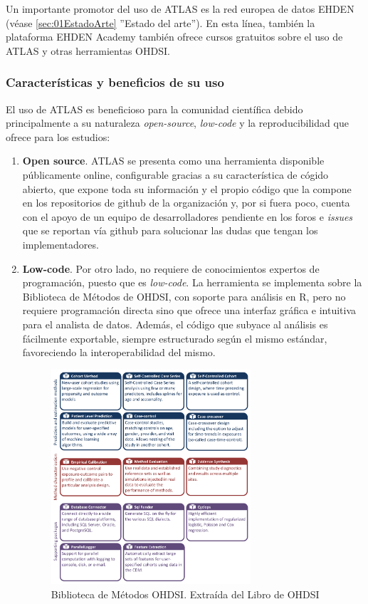 Un importante promotor del uso de ATLAS es la red europea de datos EHDEN (véase \ref{sec:01EstadoArte} ''Estado del arte''). En esta línea, también la plataforma EHDEN Academy también ofrece cursos gratuitos sobre el uso de ATLAS y otras herramientas OHDSI.

\subsubsection{Características y beneficios de su uso}

El uso de ATLAS es beneficioso para la comunidad científica debido principalmente a su naturaleza \textit{open-source}, \textit{low-code} y la reproducibilidad que ofrece para los estudios:

\begin{enumerate}[label=\roman*.]

    \item \textbf{Open source}. ATLAS se presenta como una herramienta disponible públicamente online, configurable gracias a su característica de cógido abierto, que expone toda su información y el propio código que la compone en los repositorios de github de la organización y, por si fuera poco, cuenta con el apoyo de un equipo de desarrolladores pendiente en los foros e \textit{issues} que se reportan vía github para solucionar las dudas que tengan los implementadores. 

    \item \textbf{Low-code}. Por otro lado, no requiere de conocimientos expertos de programación, puesto que es \textit{low-code}. La herramienta se implementa sobre la Biblioteca de Métodos de OHDSI, con soporte para análisis en R, pero no requiere programación directa sino que ofrece una interfaz gráfica e intuitiva para el analista de datos. Además, el código que subyace al análisis es fácilmente exportable, siempre estructurado según el mismo estándar, favoreciendo la interoperabilidad del mismo.

\begin{figure}[H]
\centering
\includegraphics[width=0.70\textwidth]{figures/methodsLibrary.png}
\caption{Biblioteca de Métodos OHDSI. Extraída del Libro de OHDSI \parencite{OHDSIbook}}
\label{fig:methodsLibrary}
\end{figure}
    

\end{enumerate}
